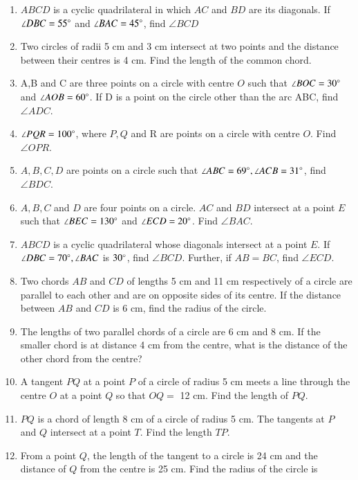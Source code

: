 \renewcommand{\theequation}{\theenumi}
\begin{enumerate}[label=\thesection.\arabic*.,ref=\thesection.\theenumi]
\item $ABCD$ is a cyclic quadrilateral in which $AC$ and $BD$ are its diagonals. If $\angle DBC = 55\degree$ and $\angle BAC = 45\degree$, find $\angle BCD$
%
\item Two circles of radii 5 cm and 3 cm intersect at two points and the distance between their centres is 4 cm. Find the length of the common chord.
%
%
\item  A,B and C are three points on a circle with centre $O$ such that $\angle BOC = 30\degree $ and $ \angle AOB = 60\degree$. If D is a point on the circle other than the arc ABC, find $\angle ADC$.
%
\item $ \angle PQR = 100\degree$, where $P, Q$ and R are
points on a circle with centre $O$. Find $\angle OPR$.
\item $A, B, C, D$ are points on a circle such that $ \angle ABC = 69\degree, \angle ACB = 31\degree$, find
$\angle BDC$.
\item $A, B, C$ and $D$ are four points on a
circle. $AC$ and $BD$ intersect at a point $E$ such
that $\angle BEC = 130\degree$ and $\angle ECD = 20\degree$. Find $\angle BAC$.
\item $ABCD$ is a cyclic quadrilateral whose diagonals intersect at a point $E$. If $\angle DBC = 70\degree,
\angle BAC$ is $30\degree$, find $\angle BCD$. Further, if $AB = BC$, find $\angle ECD$.
%
\item Two chords $AB$ and $CD$ of lengths 5 cm and 11 cm respectively of a circle are parallel
to each other and are on opposite sides of its centre. If the distance between $AB$ and
$CD$ is 6 cm, find the radius of the circle.
\item The lengths of two parallel chords of a circle are 6 cm and 8 cm. If the smaller chord is
at distance 4 cm from the centre, what is the distance of the other chord from the
centre?
%
\item A tangent $PQ$ at a point $P$ of a circle of radius 5 cm meets a line through the centre $O$ at a point $Q$ so that $OQ =$ 12 cm. Find the length of $PQ$.
%
\item $PQ$ is a chord of length 8 cm of a circle of radius 5 cm. The tangents at $P$ and $Q$ intersect at a point $T$. Find the length $TP$.
%
\item From a point $Q$, the length of the tangent to a circle is 24 cm and the distance of $Q$ from the centre is 25 cm. Find the radius of the circle is 

\end{enumerate}

